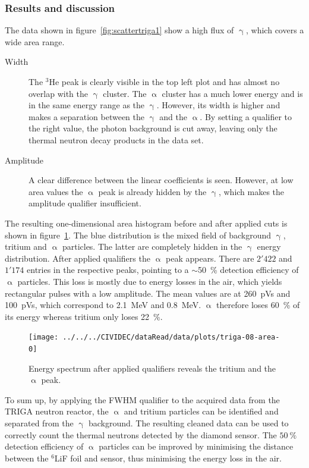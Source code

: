 \subsubsection{Results and discussion}
The data shown in figure~\ref{fig:scattertriga1} show a high flux of $\upgamma$, which covers a wide area range. 
\begin{description}
\item[Width] The $^3$He peak is clearly visible in the top left plot and has almost no overlap with the $\upgamma$ cluster. The $\upalpha$ cluster has a much lower energy and is in the same energy range as the $\upgamma$. However, its width is higher and makes a separation between the $\upgamma$ and the $\upalpha$. By setting a qualifier to the right value, the photon background is cut away, leaving only the thermal neutron decay products in the data set. 
\item[Amplitude] A clear difference between the linear coefficients is seen. However, at low area values the $\upalpha$ peak is already hidden by the $\upgamma$, which makes the amplitude qualifier insufficient.
\end{description}
The resulting one-dimensional area histogram before and after applied cuts is shown in figure~\ref{fig:areatriga0}. The blue distribution is the mixed field of background $\upgamma$, tritium and $\upalpha$ particles. The latter are completely hidden in the $\upgamma$ energy distribution. After applied qualifiers the $\upalpha$ peak appears. There are $2'422$ and $1'174$ entries in the respective peaks, pointing to a $\sim$50~\% detection efficiency of $\upalpha$ particles. This loss is mostly due to energy losses in the air, which yields rectangular pulses with a low amplitude. The mean values are at 260~pVs and 100~pVs, which correspond to 2.1~MeV and 0.8~MeV. $\upalpha$ therefore loses 60~\% of its energy whereas tritium only loses 22~\%.

\clearpage
\begin{figure}[!t]
\centering
\texttt{[image: ../../../CIVIDEC/dataRead/data/plots/triga-08-area-0]}
\caption{Energy spectrum after applied qualifiers reveals the tritium and the $\upalpha$ peak.}
\label{fig:areatriga0}
\end{figure}

To sum up, by applying the FWHM qualifier to the acquired data from the TRIGA neutron reactor, the $\upalpha$ and tritium particles can be identified and separated from the $\upgamma$ background. The resulting cleaned data can be used to correctly count the thermal neutrons detected by the diamond sensor. The $50~\%$ detection efficiency of $\upalpha$ particles can be improved by minimising the distance between the $^6$LiF foil and sensor, thus minimising the energy loss in the air.










